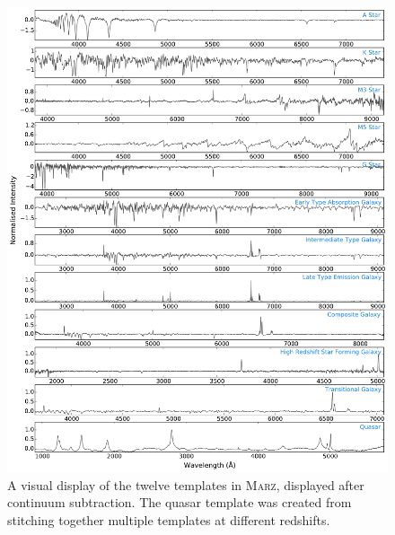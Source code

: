 \documentclass[iop]{emulateapj}
\newcommand{\marz}{\textsc{Marz}}
\begin{document}
\begin{figure}[h]
\centering
\includegraphics[width=\textwidth]{templates.pdf}
\caption{A visual display of the twelve templates in \marz{}, displayed after continuum subtraction. The quasar template was created from stitching together multiple templates at different redshifts.}
\label{fig:templates}
\end{figure}
\end{document}
